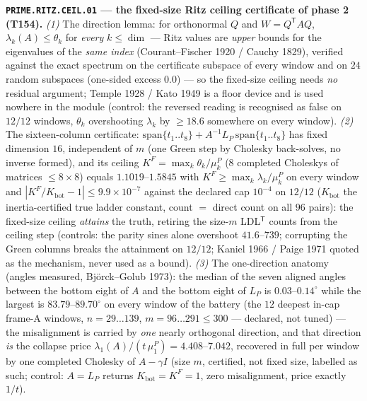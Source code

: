\par\smallskip\noindent\textbf{\texttt{PRIME.RITZ.CEIL.01} --- the
fixed-size Ritz ceiling certificate of phase 2 (T154).}
\emph{(1)} The direction lemma: for orthonormal $Q$ and
$W=Q^{\mathsf T}AQ$, $\lambda_k(A)\le\theta_k$ for \emph{every}
$k\le\dim$ --- Ritz values are \emph{upper} bounds for the eigenvalues of
the \emph{same index} (Courant--Fischer 1920 / Cauchy 1829), verified
against the exact spectrum on the certificate subspace of every window
and on $24$ random subspaces (one-sided excess $0.0$) --- so the
fixed-size ceiling needs \emph{no} residual argument; Temple 1928 / Kato
1949 is a floor device and is used nowhere in the module (control: the
reversed reading is recognised as false on $12/12$ windows, $\theta_k$
overshooting $\lambda_k$ by $\ge18.6$ somewhere on every window).
\emph{(2)} The sixteen-column certificate:
$\mathrm{span}\{t_1..t_8\}+A^{-1}L_P\,\mathrm{span}\{t_1..t_8\}$ has
fixed dimension $16$, independent of $m$ (one Green step by Cholesky
back-solves, no inverse formed), and its ceiling
$K^F=\max_k\theta_k/\mu^P_k$ ($8$ completed Choleskys of matrices
$\le8\times8$) equals $1.1019$--$1.5845$ with
$K^F\ge\max_k\lambda_k/\mu^P_k$ on every window and
$|K^F/K_{\mathrm{bot}}-1|\le9.9\times10^{-7}$ against the declared cap
$10^{-4}$ on $12/12$ ($K_{\mathrm{bot}}$ the inertia-certified true
ladder constant, count $=$ direct count on all $96$ pairs): the
fixed-size ceiling \emph{attains} the truth, retiring the size-$m$
LDL$^{\mathsf T}$ counts from the ceiling step (controls: the parity
sines alone overshoot $41.6$--$739$; corrupting the Green columns breaks
the attainment on $12/12$; Kaniel 1966 / Paige 1971 quoted as the
mechanism, never used as a bound). \emph{(3)} The one-direction anatomy
(angles measured, Bj\"orck--Golub 1973): the median of the seven aligned
angles between the bottom eight of $A$ and the bottom eight of $L_P$ is
$0.03$--$0.14^\circ$ while the largest is $83.79$--$89.70^\circ$ on every
window of the battery (the $12$ deepest in-cap frame-A windows,
$n=29\ldots139$, $m=96\ldots291\le300$ --- declared, not tuned) --- the
misalignment is carried by \emph{one} nearly orthogonal direction, and
that direction \emph{is} the collapse price
$\lambda_1(A)/(t\,\mu^P_1)=4.408$--$7.042$, recovered in full per window
by one completed Cholesky of $A-\gamma I$ (size $m$, certified, not
fixed size, labelled as such; control: $A=L_P$ returns
$K_{\mathrm{bot}}=K^F=1$, zero misalignment, price exactly $1/t$).
